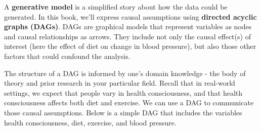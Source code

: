 \documentclass[
]{book}
\newenvironment{Shaded}{\begin{snugshade}}{\end{snugshade}}
\newcommand{\AttributeTok}[1]{\textcolor[rgb]{0.13,0.29,0.53}{#1}}
\newcommand{\CommentTok}[1]{\textcolor[rgb]{0.56,0.35,0.01}{\textit{#1}}}
\newcommand{\FunctionTok}[1]{\textcolor[rgb]{0.13,0.29,0.53}{\textbf{#1}}}
\newcommand{\NormalTok}[1]{#1}
\newcommand{\OtherTok}[1]{\textcolor[rgb]{0.56,0.35,0.01}{#1}}
\newcommand{\SpecialCharTok}[1]{\textcolor[rgb]{0.81,0.36,0.00}{\textbf{#1}}}
\newcommand{\StringTok}[1]{\textcolor[rgb]{0.31,0.60,0.02}{#1}}
\begin{document}
A \textbf{generative model} is a simplified story about how the data could be generated. In this book, we'll express causal assumptions using \textbf{directed acyclic graphs (DAGs)}. DAGs are graphical models that represent variables as nodes and causal relationships as arrows. They include not only the causal effect(s) of interest (here the effect of diet on change in blood pressure), but also those other factors that could confound the analysis.

The structure of a DAG is informed by one's domain knowledge - the body of theory and prior research in your particular field. Recall that in real-world settings, we expect that people vary in health consciousness, and that health consciousness affects both diet and exercise. We can use a DAG to communicate those causal assumptions. Below is a simple DAG that includes the variables health consciousness, diet, exercise, and blood pressure.

\begin{Shaded}
\end{Shaded}
\end{document}
